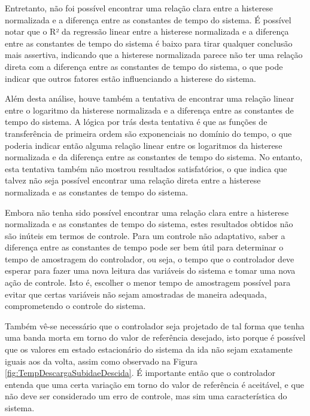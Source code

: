 Entretanto, não foi possível encontrar uma relação clara entre a histerese normalizada e a diferença entre as constantes de tempo do sistema. É possível notar que o R² da regressão linear entre a histerese normalizada e a diferença entre as constantes de tempo do sistema é baixo para tirar qualquer conclusão mais assertiva, indicando que a histerese normalizada parece não ter uma relação direta com a diferença entre as constantes de tempo do sistema, o que pode indicar que outros fatores estão influenciando a histerese do sistema.

Além desta análise, houve também a tentativa de encontrar uma relação linear entre o logaritmo da histerese normalizada e a diferença entre as constantes de tempo do sistema. A lógica por trás desta tentativa é que as funções de transferência de primeira ordem são exponenciais no domínio do tempo, o que poderia indicar então alguma relação linear entre os logaritmos da histerese normalizada e da diferença entre as constantes de tempo do sistema. No entanto, esta tentativa também não mostrou resultados satisfatórios, o que indica que talvez não seja possível encontrar uma relação direta entre a histerese normalizada e as constantes de tempo do sistema. 

Embora não tenha sido possível encontrar uma relação clara entre a histerese normalizada e as constantes de tempo do sistema, estes resultados obtidos não são inúteis em termos de controle.
Para um controle não adaptativo, saber a diferença entre as constantes de tempo pode ser bem útil para determinar o tempo de amostragem do controlador, ou seja, o tempo que o controlador deve esperar para fazer uma nova leitura das variáveis do sistema e tomar uma nova ação de controle. Isto é, escolher o menor tempo de amostragem possível para evitar que certas variáveis não sejam amostradas de maneira adequada, comprometendo o controle do sistema.

Também vê-se necessário que o controlador seja projetado de tal forma que tenha uma banda morta em torno do valor de referência desejado, isto porque é possível que os valores em estado estacionário do sistema da ida não sejam exatamente iguais aos da volta, assim como observado na Figura \ref{fig:TempDescargaSubidaeDescida}. É importante então que o controlador entenda que uma certa variação em torno do valor de referência é aceitável, e que não deve ser considerado um erro de controle, mas sim uma característica do sistema.

